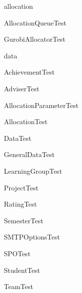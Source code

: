 \documentclass[parskip=full]{scrartcl}
\begin{document}
\begin{itemPackage}
	\item allocation
		\begin{itemClass}
			\item AllocationQueueTest
		\end{itemClass}
		\begin{itemClass}
			\item GurobiAllocatorTest
		\end{itemClass}
\end{itemPackage}
\begin{itemPackage}
	\item data
	\begin{itemClass}
		\item AchievementTest
	\end{itemClass}
	\begin{itemClass}
		\item AdviserTest
	\end{itemClass}
	\begin{itemClass}
		\item AllocationParameterTest
	\end{itemClass}
	\begin{itemClass}
		\item AllocationTest
	\end{itemClass}
	\begin{itemClass}
		\item DataTest
	\end{itemClass}
	\begin{itemClass}
		\item GeneralDataTest
	\end{itemClass}
	\begin{itemClass}
		\item LearningGroupTest
	\end{itemClass}
	\begin{itemClass}
		\item ProjectTest
	\end{itemClass}
	\begin{itemClass}
		\item RatingTest
	\end{itemClass}
	\begin{itemClass}
		\item SemesterTest
	\end{itemClass}
	\begin{itemClass}
		\item SMTPOptionsTest
	\end{itemClass}
	\begin{itemClass}
		\item SPOTest
	\end{itemClass}
	\begin{itemClass}
		\item StudentTest
	\end{itemClass}
	\begin{itemClass}
		\item TeamTest
	\end{itemClass}
\end{itemPackage}
\end{document}

